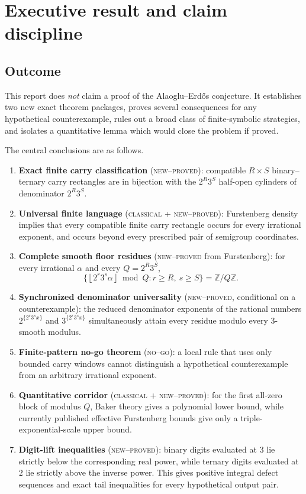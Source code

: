 \documentclass[11pt]{article}
\theoremstyle{definition}
\theoremstyle{remark}
\newcommand{\Z}{\mathbb Z}
\newcommand{\floor}[1]{\left\lfloor#1\right\rfloor}
\newcommand{\statusproved}{\textcolor{deepgreen}{\textsc{new--proved}}}
\newcommand{\statusclassical}{\textcolor{deepblue}{\textsc{classical}}}
\newcommand{\statusnegative}{\textcolor{deepred}{\textsc{no--go}}}
\begin{document}
\tableofcontents
\newpage

\section{Executive result and claim discipline}

\subsection{Outcome}

This report does \emph{not} claim a proof of the Alaoglu--Erd\H{o}s conjecture.  It
establishes two new exact theorem packages, proves several consequences for any
hypothetical counterexample, rules out a broad class of finite-symbolic strategies,
and isolates a quantitative lemma which would close the problem if proved.

The central conclusions are as follows.

\begin{enumerate}
\item \textbf{Exact finite carry classification} (\statusproved): compatible
$R\times S$ binary--ternary carry rectangles are in bijection with the
$2^R3^S$ half-open cylinders of denominator $2^R3^S$.

\item \textbf{Universal finite language} (\statusclassical{} + \statusproved):
Furstenberg density implies that every compatible finite carry rectangle occurs for
every irrational exponent, and occurs beyond every prescribed pair of semigroup
coordinates.

\item \textbf{Complete smooth floor residues} (\statusproved{} from Furstenberg):
for every irrational $\alpha$ and every $Q=2^R3^S$,
\[
 \bigl\{\floor{2^r3^s\alpha}\bmod Q:r\ge R,\ s\ge S\bigr\}=\Z/Q\Z.
\]

\item \textbf{Synchronized denominator universality} (\statusproved,
conditional on a counterexample): the reduced denominator exponents of the rational
numbers $2^{\{2^r3^s x\}}$ and $3^{\{2^r3^s x\}}$ simultaneously attain every
residue modulo every $3$-smooth modulus.

\item \textbf{Finite-pattern no-go theorem} (\statusnegative): a local rule that
uses only bounded carry windows cannot distinguish a hypothetical counterexample
from an arbitrary irrational exponent.

\item \textbf{Quantitative corridor} (\statusclassical{} + \statusproved): for
the first all-zero block of modulus $Q$, Baker theory gives a polynomial lower bound,
while currently published effective Furstenberg bounds give only a
triple-exponential-scale upper bound.

\item \textbf{Digit-lift inequalities} (\statusproved): binary digits evaluated at
$3$ lie strictly below the corresponding real power, while ternary digits evaluated
at $2$ lie strictly above the inverse power.  This gives positive integral defect
sequences and exact tail inequalities for every hypothetical output pair.
\end{enumerate}
\end{document}
